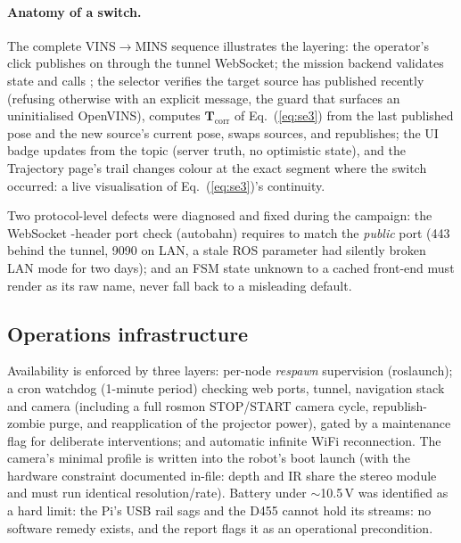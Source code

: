 \paragraph{Anatomy of a switch.} The complete VINS$\to$MINS sequence
illustrates the layering: the operator's click publishes
 on
 through the tunnel WebSocket; the mission backend
validates state and calls ; the
selector verifies the target source has published recently (refusing
otherwise with an explicit message, the guard that surfaces an
uninitialised OpenVINS), computes $\mathbf{T}_{\mathrm{corr}}$ of
Eq.~(\ref{eq:se3}) from the last published pose and the new source's current
pose, swaps sources, and republishes; the UI badge updates from the
 topic (server truth, no optimistic
state), and the Trajectory page's trail changes colour at the exact segment
where the switch occurred: a live visualisation of Eq.~(\ref{eq:se3})'s
continuity.

Two protocol-level defects were diagnosed and fixed during the campaign:
the WebSocket -header port check (autobahn) requires
 to match the \emph{public} port (443 behind
the tunnel, 9090 on LAN, a stale ROS parameter had silently broken LAN
mode for two days); and an FSM state unknown to a cached front-end must render
as its raw name, never fall back to a misleading default.

\subsection{Operations infrastructure}
Availability is enforced by three layers: per-node \emph{respawn} supervision
(roslaunch); a cron watchdog (1-minute period) checking web ports, tunnel,
navigation stack and camera (including a full rosmon STOP/START camera
cycle, republish-zombie purge, and reapplication of the projector power),
gated by a maintenance flag for deliberate interventions; and automatic
infinite WiFi reconnection. The camera's minimal profile is written into the
robot's boot launch (with the hardware constraint documented in-file: depth
and IR share the stereo module and must run identical resolution/rate).
Battery under $\sim$10.5\,V was identified as a hard limit: the Pi's USB rail
sags and the D455 cannot hold its streams: no software remedy exists, and
the report flags it as an operational precondition.

